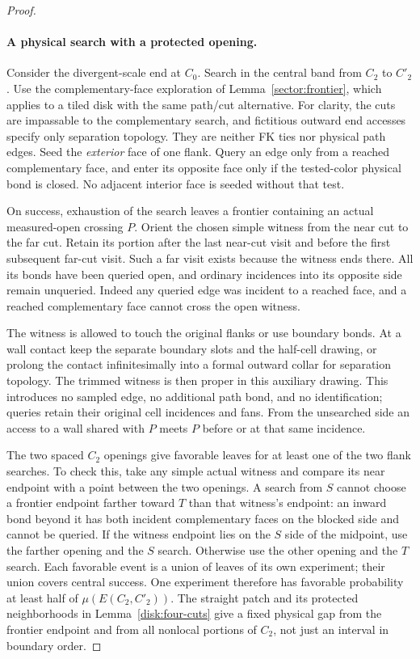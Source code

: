 \begin{proof}
\paragraph{A physical search with a protected opening.}
Consider the divergent-scale end at $C_0$.  Search in the central band
from $C_2$ to $C'_2$.  Use the complementary-face exploration of
Lemma~\ref{sector:frontier}, which applies to a tiled disk with the
same path/cut alternative.  For clarity, the cuts are impassable to
the complementary search, and fictitious outward end accesses specify
only separation topology.  They are neither FK ties nor physical path
edges.  Seed the \emph{exterior} face of one flank.  Query an edge only
from a reached complementary face, and enter its opposite face only
if the tested-color physical bond is closed.  No adjacent interior
face is seeded without that test.

On success, exhaustion of the search leaves a frontier containing an
actual measured-open crossing $P$.  Orient the chosen simple witness
from the near cut to the far cut.  Retain its portion after the last
near-cut visit and before the first subsequent far-cut visit.  Such
a far visit exists because the witness ends there.  All its bonds have
been queried open, and ordinary incidences into its opposite side
remain unqueried.  Indeed any queried edge was incident to a reached
face, and a reached complementary face cannot cross the open witness.

The witness is allowed to touch the original flanks or use boundary
bonds.  At a wall contact keep the separate boundary slots and the
half-cell drawing, or prolong the contact infinitesimally into a formal
outward collar for separation topology.  The trimmed witness is then
proper in this auxiliary drawing.  This introduces no sampled edge,
no additional path bond, and no identification; queries retain their
original cell incidences and fans.  From the unsearched side an access
to a wall shared with $P$ meets $P$ before or at that same incidence.

The two spaced $C_2$ openings give favorable leaves for at least one
of the two flank searches.  To check this, take any simple actual
witness and compare its near endpoint with a point between the two
openings.  A search from $S$ cannot choose a frontier endpoint farther
toward $T$ than that witness's endpoint: an inward bond beyond it has
both incident complementary faces on the blocked side and cannot be
queried.  If the witness endpoint lies on the $S$ side of the midpoint,
use the farther opening and the $S$ search.  Otherwise use the other
opening and the $T$ search.  Each favorable event is a union of leaves
of its own experiment; their union covers central success.  One
experiment therefore has favorable probability at least half of
$\mu(E(C_2,C'_2))$.  The straight patch and its protected neighborhoods
in Lemma~\ref{disk:four-cuts} give a fixed physical gap from the
frontier endpoint and from all nonlocal portions of $C_2$, not just
an interval in boundary order.


\end{proof}
